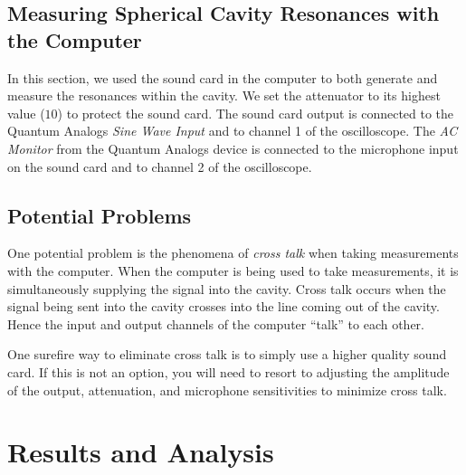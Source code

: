 \documentclass[12pt]{article}
\renewcommand{\deg}{^\circ} %
\newcommand{\red}[1]{\textbf{\textcolor{red}{#1}}} %
\begin{document}
	
	\subsection{Measuring Spherical Cavity Resonances with the Computer}
	In this section, we used the sound card in the computer to both generate and measure the resonances within the cavity. We set the attenuator to its highest value ($10$) to protect the sound card. The sound card output is connected to the Quantum Analogs \emph{Sine Wave Input} and to channel 1 of the oscilloscope. The \emph{AC Monitor} from the Quantum Analogs device is connected to the microphone input on the sound card and to channel 2 of the oscilloscope. 
	

	
	
	\subsection{Potential Problems}
	One potential problem is the phenomena of \emph{cross talk} when taking measurements with the computer. When the computer is being used to take measurements, it is simultaneously supplying the signal into the cavity. Cross talk occurs when the signal being sent into the cavity crosses into the line coming out of the cavity. Hence the input and output channels of the computer ``talk'' to each other. 
	
	One surefire way to eliminate cross talk is to simply use a higher quality sound card. If this is not an option, you will need to resort to adjusting the amplitude of the output, attenuation, and microphone sensitivities to minimize cross talk.
	
	
	
	
\section{Results and Analysis}
	
\end{document}
